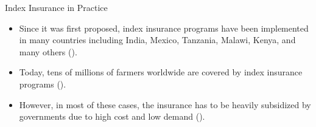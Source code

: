 \documentclass{beamer}
\begin{document}
\begin{frame}{Index Insurance in Practice}
    \begin{itemize}
        \setlength\itemsep{1.5em}
        \item Since it was first proposed, index insurance programs have been implemented in many countries including India, Mexico, Tanzania, Malawi, Kenya, and many others (\cite{jensen2017agricultural}). 
        
        \item Today, tens of millions of farmers worldwide are covered by index insurance programs (\cite{greatrex2015scaling}). 
        
        \item However, in most of these cases, the insurance has to be heavily subsidized by governments due to high cost and low demand (\cite{greatrex2015scaling}). 
    \end{itemize}
    \end{frame}

    

\end{document}
